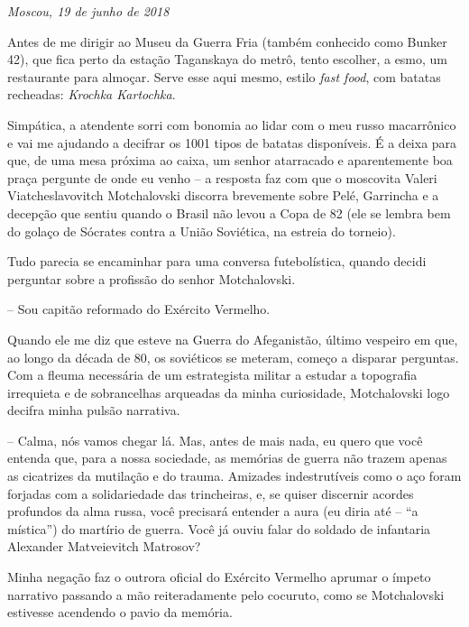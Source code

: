 \begin{flushright}
\emph{Moscou, 19 de junho de 2018}
\end{flushright}

Antes de me dirigir ao Museu da Guerra Fria (também conhecido como
Bunker 42), que fica perto da estação Taganskaya do metrô, tento
escolher, a esmo, um restaurante para almoçar. Serve esse aqui mesmo,
estilo \emph{fast food}, com batatas recheadas: \emph{Krochka
Kartochka}.

Simpática, a atendente sorri com bonomia ao lidar com o meu russo
macarrônico e vai me ajudando a decifrar os 1001 tipos de batatas
disponíveis. É a deixa para que, de uma mesa próxima ao caixa, um senhor
atarracado e aparentemente boa praça pergunte de onde eu venho -- a
resposta faz com que o moscovita Valeri Viatcheslavovitch Motchalovski
discorra brevemente sobre Pelé, Garrincha e a decepção que sentiu quando
o Brasil não levou a Copa de 82 (ele se lembra bem do golaço de Sócrates
contra a União Soviética, na estreia do torneio).

Tudo parecia se encaminhar para uma conversa futebolística, quando
decidi perguntar sobre a profissão do senhor Motchalovski.

-- Sou capitão reformado do Exército Vermelho.

Quando ele me diz que esteve na Guerra do Afeganistão, último vespeiro
em que, ao longo da década de 80, os soviéticos se meteram, começo a
disparar perguntas. Com a fleuma necessária de um estrategista militar a
estudar a topografia irrequieta e de sobrancelhas arqueadas da minha
curiosidade, Motchalovski logo decifra minha pulsão narrativa.

-- Calma, nós vamos chegar lá. Mas, antes de mais nada, eu quero que
você entenda que, para a nossa sociedade, as memórias de guerra não
trazem apenas as cicatrizes da mutilação e do trauma. Amizades
indestrutíveis como o aço foram forjadas com a solidariedade das
trincheiras, e, se quiser discernir acordes profundos da alma russa,
você precisará entender a aura (eu diria até -- ``a mística'') do
martírio de guerra. Você já ouviu falar do soldado de infantaria
Alexander Matveievitch Matrosov?

Minha negação faz o outrora oficial do Exército Vermelho aprumar o
ímpeto narrativo passando a mão reiteradamente pelo cocuruto, como se
Motchalovski estivesse acendendo o pavio da memória.


